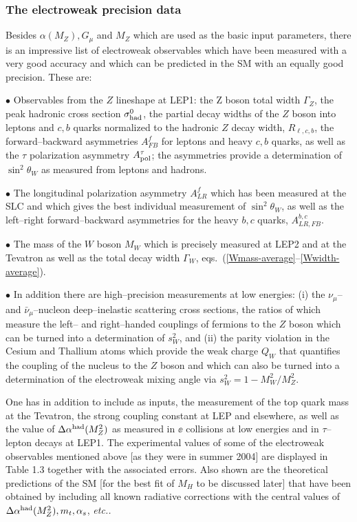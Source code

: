 \subsubsection{The electroweak precision data}

Besides $\alpha(M_Z), G_\mu$ and $M_Z$ which are used as the basic input
parameters, there is an impressive list of electroweak observables which have
been measured with a very good accuracy and which can be predicted in the SM
with an equally good precision. These are:  

$\bullet$ Observables from the $Z$ lineshape at LEP1: the Z boson 
total width $\Gamma_Z$, the peak hadronic cross section $\sigma^0_{\rm had}$,
the partial decay widths of the $Z$ boson into leptons and $c,b$ quarks 
normalized to the hadronic $Z$ decay width, $R_{\ell, c,b}$, 
the forward--backward asymmetries $A_{FB}^f$ for leptons and heavy $c,b$ 
quarks, as well as the $\tau$  polarization asymmetry $A^\tau_{\rm pol}$;  
the asymmetries provide a determination of $\sin^2\theta_W$ as measured
from leptons and hadrons. \s

$\bullet$ The longitudinal polarization asymmetry $A_{LR}^f$ which has 
been measured at the SLC and which  gives the best individual measurement of
$\sin^2\theta_W$, as well as the left--right forward--backward asymmetries for
the heavy $b,c$ quarks,  $A^{b,c}_{LR,FB}$. \s

$\bullet$ The mass of the $W$ boson $M_W$ which is precisely  measured 
at LEP2 and at the Tevatron as well as the total decay width $\Gamma_W$,
eqs.~(\ref{Wmass-average}--\ref{Wwidth-average}). \s

$\bullet$  In addition there are high--precision measurements at low energies:
(i) the $\nu_\mu$-- and $\bar{\nu}_\mu$--nucleon deep--inelastic scattering
cross sections, the ratios of which measure the left-- and right--handed
couplings of fermions to the $Z$ boson which can be turned into a determination
of $s_W^2$, and (ii) the parity violation in the Cesium and Thallium atoms
which provide the weak charge $Q_W$ that quantifies the coupling of the nucleus
to the $Z$ boson and which can also be turned into a determination of the 
electroweak mixing angle via $s_W^2 =1-M_W^2/M_Z^2$.\s

One has in addition to include as inputs, the measurement of the top quark mass
at the Tevatron, the strong coupling constant at LEP and elsewhere, as well as
the value of $\Delta \alpha^{\rm had} (M_Z^2)$ as measured in $\ee$ collisions 
at low energies and in $\tau$--lepton decays at LEP1. The experimental values of
some of the electroweak observables mentioned above [as they were in summer
2004] are displayed in Table 1.3 together with the associated errors. Also shown
are the theoretical predictions of the SM [for the best fit of $M_H$ to be
discussed later] that have been obtained by including all known radiative 
corrections with the central values of $\Delta \alpha^{\rm had} (M_Z^2), m_t, 
\alpha_s$, {\it etc..} \s

